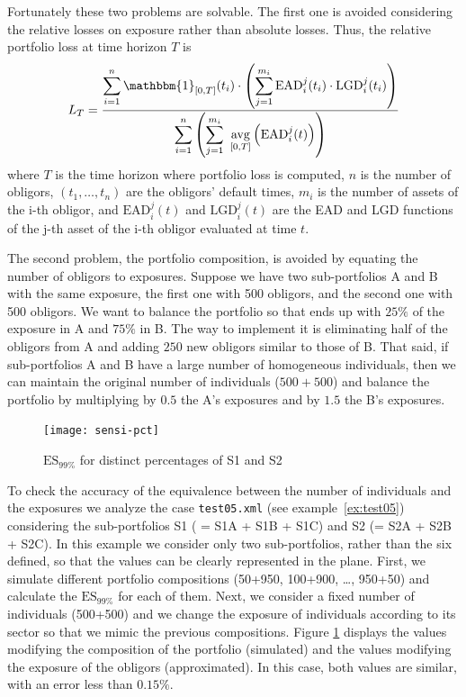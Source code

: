 \documentclass[11pt,fleqn]{book} %
\begin{document}
Fortunately these two problems are solvable. The first one is avoided
considering the relative losses on exposure rather than absolute losses. 
Thus, the relative portfolio loss at time horizon $T$ is
\begin{displaymath}
	L_T = \frac{
	\displaystyle \sum_{i=1}^n \mathbbm{1}_{[0,T]}(t_i) \cdot 
	\left( 
	\sum_{j=1}^{m_i} \text{EAD}_i^j(t_i) \cdot \text{LGD}_i^j(t_i)
	\right)}
	{\displaystyle \sum_{i=1}^n
	\left( 
	\sum_{j=1}^{m_i}\ \underset{[0,T]}{\text{avg}} \left( \text{EAD}_i^j(t) \right)
	\right)}
\end{displaymath}
where $T$ is the time horizon where portfolio loss is computed, $n$ is the 
number of obligors, $(t_1,\dots,t_n)$ are the obligors' default times, $m_i$ 
is the number of assets of the i-th obligor, and $\text{EAD}_i^j(t)$ and 
$\text{LGD}_i^j(t)$ are the EAD and LGD functions of the j-th asset of the 
i-th obligor evaluated at time $t$.

The second problem, the portfolio composition, is avoided by equating the number 
of obligors to exposures. Suppose we have two sub-portfolios A and B with the 
same exposure, the first one with 500 obligors, and the second one with 500 
obligors. We want to balance the portfolio so that ends up with $25\%$ of the 
exposure in A and $75\%$ in B. The way to implement it is eliminating 
half of the obligors from A and adding $250$ new obligors similar to those of 
B. That said, if sub-portfolios A and B have a large number of homogeneous 
individuals, then we can maintain the original number of individuals 
($500+500$) and balance the portfolio by multiplying by $0.5$ the A's exposures 
and by $1.5$ the B's exposures.

\begin{figure}[!ht]
	\centering
	\texttt{[image: sensi-pct]}
	\caption{$\text{ES}_{99\%}$ for distinct percentages of S1 and S2}
	\label{fig:popt2}
\end{figure}

\begin{example}
	To check the accuracy of the equivalence between the number of individuals 
	and the exposures we analyze the case \texttt{test05.xml} (see 
	example~\ref{ex:test05}) considering the sub-portfolios S1 ( = S1A + 
	S1B + S1C) and S2 (= S2A + S2B + S2C). In this example we consider only two 
	sub-portfolios, rather than the six defined, so that the values can be 
	clearly represented in the plane. First, we simulate different portfolio 
	compositions (50+950, 100+900, \dots, 950+50) and calculate the 
	$\text{ES}_{99\%}$ for each of them. Next, we consider a fixed number of 
	individuals (500+500) and we change the exposure of individuals according to 
	its sector so that we mimic the previous compositions. Figure \ref{fig:popt2} 
	displays the values modifying the composition of the portfolio (simulated) 
	and the values modifying the exposure of the obligors (approximated). In this 
	case, both values are similar, with an error less than $0.15\%$.
\end{example}
\end{document}
